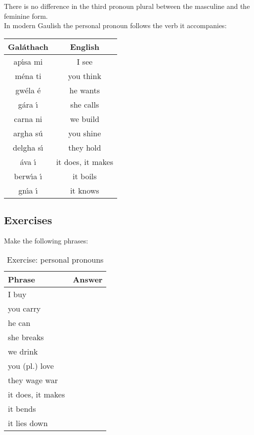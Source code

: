 \noindent There is no difference in the third pronoun plural between the masculine and the feminine form.\\

\noindent In modern Gaulish the personal pronoun follows the verb it accompanies:
\begin{table}[H]
\begin{tabu}{c|c}
  \textbf{Gal\'{a}thach} & \textbf{English}\\
  \toprule
  ap\'{\i}sa mi & I see\\
  m\'{e}na ti & you think\\
  gw\'{e}la \'{e} & he wants\\
  g\'{a}ra \'{\i} & she calls\\
  carna ni & we build\\
  argha s\'{u} & you shine\\
  delgha s\'{\i} & they hold\\
  \'{a}va \'{\i} & it  does, it makes\\
  berw\'{\i}a \'{\i} & it boils\\
  gn\'{\i}a \'{\i} & it knows\\
\end{tabu}
\label{examples_personal_pronoun}
\end{table}

\subsection{Exercises}

\noindent Make the following phrases:\\
\begin{table}[H]
\begin{center}
\begin{tabu}{|l|p{10.0cm}|}
  \toprule
  \textbf{Phrase} & \textbf{Answer}\\
  \toprule
  I buy & \\
  \midrule
  you carry & \\
  \midrule
  he can & \\
  \midrule
  she breaks & \\
  \midrule
  we drink & \\
  \midrule
  you (pl.) love & \\
  \midrule
  they wage war & \\
  \midrule
  it does, it makes & \\
  \midrule
  it bends & \\
  \midrule
  it lies down & \\
  \bottomrule
\end{tabu}
\end{center}
\label{exercises_personal_pronouns}
\caption{Exercise: personal pronouns}
\end{table}

